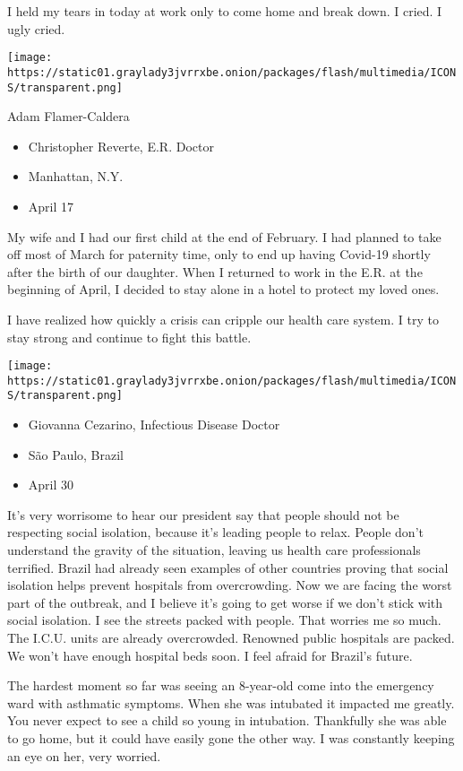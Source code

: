 I held my tears in today at work only to come home and break down. I
cried. I ugly cried.

\texttt{[image: https://static01.graylady3jvrrxbe.onion/packages/flash/multimedia/ICONS/transparent.png]}

Adam Flamer-Caldera

\begin{itemize}
\tightlist
\item
  Christopher Reverte, E.R. Doctor
\item
  Manhattan, N.Y.
\item
  April 17
\end{itemize}

My wife and I had our first child at the end of February. I had planned
to take off most of March for paternity time, only to end up having
Covid-19 shortly after the birth of our daughter. When I returned to
work in the E.R. at the beginning of April, I decided to stay alone in a
hotel to protect my loved ones.

I have realized how quickly a crisis can cripple our health care system.
I try to stay strong and continue to fight this battle.

\texttt{[image: https://static01.graylady3jvrrxbe.onion/packages/flash/multimedia/ICONS/transparent.png]}

\begin{itemize}
\tightlist
\item
  Giovanna Cezarino, Infectious Disease Doctor
\item
  São Paulo, Brazil
\item
  April 30
\end{itemize}

It's very worrisome to hear our president say that people should not be
respecting social isolation, because it's leading people to relax.
People don't understand the gravity of the situation, leaving us health
care professionals terrified. Brazil had already seen examples of other
countries proving that social isolation helps prevent hospitals from
overcrowding. Now we are facing the worst part of the outbreak, and I
believe it's going to get worse if we don't stick with social isolation.
I see the streets packed with people. That worries me so much. The
I.C.U. units are already overcrowded. Renowned public hospitals are
packed. We won't have enough hospital beds soon. I feel afraid for
Brazil's future.

The hardest moment so far was seeing an 8-year-old come into the
emergency ward with asthmatic symptoms. When she was intubated it
impacted me greatly. You never expect to see a child so young in
intubation. Thankfully she was able to go home, but it could have easily
gone the other way. I was constantly keeping an eye on her, very
worried.


